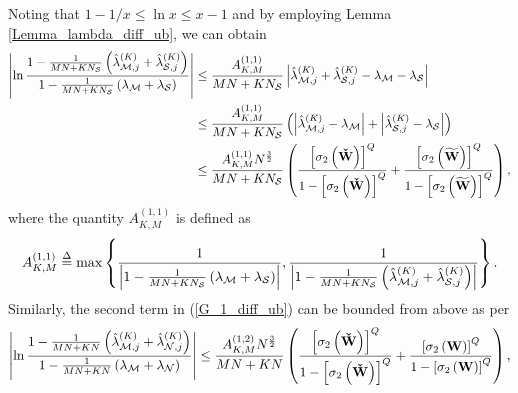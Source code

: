 \documentclass[11pt, draftclsnofoot, onecolumn]{IEEEtran}
\newcommand{\cW}{{\check{W}}}
\newcommand{\tW}{{\widetilde{W}}}
\begin{document}
\begin{IEEEproof}
Noting that $1 - 1/x \le \ln x \le x - 1$
and by employing Lemma \ref{Lemma_lambda_diff_ub}, we can obtain
\begin{align} \notag
\left| {\ln \frac{{1 - \frac{1}{{MN + K{N_{\cal S}}}}\left( {\hat \lambda _{{\cal M},j}^{(K)} + \hat \lambda _{{\cal S},j}^{(K)}} \right)}}{{1 - \frac{1}{{MN + K{N_{\cal S}}}}\left( {{\lambda _{\cal M}} + {\lambda _{\cal S}}} \right)}}} \right| & \le   \frac{{A_{K,M}^{(1,1)}}}{{MN + K{N_{\cal S}}}}\left| {\hat \lambda _{{\cal M},j}^{(K)} + \hat \lambda _{{\cal S},j}^{(K)} - {\lambda _{\cal M}} - {\lambda _{\cal S}}} \right| \\ \notag
& \le \frac{{A_{K,M}^{(1,1)}}}{{MN + K{N_{\cal S}}}}\left( {\left| {\hat \lambda _{{\cal M},j}^{(K)} - {\lambda _{\cal M}}} \right| + \left| {\hat \lambda _{{\cal S},j}^{(K)} - {\lambda _{\cal S}}} \right|} \right)\\  \label{G_1_1st_term_diff_ub}
& \le \frac{{A_{K,M}^{(1,1)}{N^{\frac{3}{2}}}}}{{MN + K{N_{\cal S}}}}\left( {\frac{{{{\left[ {{\sigma _2}\left( {\bf{\cW}} \right)} \right]}^Q}}}{{1 - {{\left[ {{\sigma _2}\left( {\bf{\cW}} \right)} \right]}^Q}}} + \frac{{{{\left[ {{\sigma _2}\left( {\bf{\tW}} \right)} \right]}^Q}}}{{1 - {{\left[ {{\sigma _2}\left( {\bf{\tW}} \right)} \right]}^Q}}}} \right),
\end{align}
where the quantity $A_{K,M}^{(1,1)}$ is defined as
\begin{equation} \label{A_1_1_define}
A_{K,M}^{(1,1)} \buildrel \Delta \over = \max \left\{ {\frac{1}{{\left| {1 - \frac{1}{{MN + K{N_{\cal S}}}}\left( {{\lambda _{\cal M}} + {\lambda _{\cal S}}} \right)} \right|}},\frac{1}{{\left| {1 - \frac{1}{{MN + K{N_{\cal S}}}}\left( {\hat \lambda _{{\cal M},j}^{(K)} + \hat \lambda _{{\cal S},j}^{(K)}} \right)} \right|}}} \right\}.
\end{equation}
Similarly, the second term in (\ref{G_1_diff_ub}) can be bounded from above as per
\begin{equation}  \label{G_1_2nd_term_diff_ub}
\left| {\ln \frac{{1 - \frac{1}{{MN + KN}}\left( {\hat \lambda _{{\cal M},j}^{(K)} + \hat \lambda _{{\cal N},j}^{(K)}} \right)}}{{1 - \frac{1}{{MN + KN}}\left( {{\lambda _{\cal M}} + {\lambda _{\cal N}}} \right)}}} \right| \le \frac{{A_{K,M}^{(1,2)}{N^{\frac{3}{2}}}}}{{MN + KN}}\left( {\frac{{{{\left[ {{\sigma _2}\left( {\bf{\cW}} \right)} \right]}^Q}}}{{1 - {{\left[ {{\sigma _2}\left( {\bf{\cW}} \right)} \right]}^Q}}} + \frac{{{{\left[ {{\sigma _2}\left( {\bf{W}} \right)} \right]}^Q}}}{{1 - {{\left[ {{\sigma _2}\left( {\bf{W}} \right)} \right]}^Q}}}} \right),

\end{equation}
\end{IEEEproof}
\end{document}
